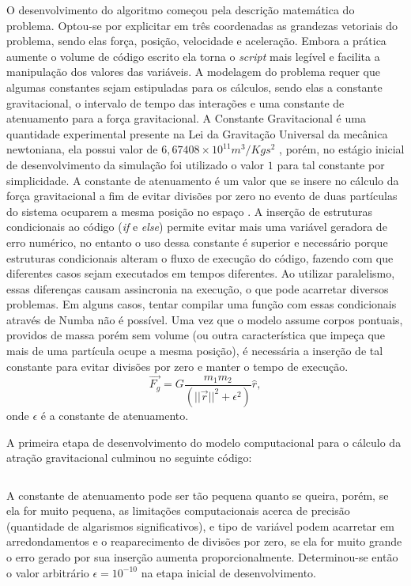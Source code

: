 \documentclass[
	12pt,				%
	a4paper,			%
	english,			%
	openright,				%
	brazil,				%
	oneside]{abntex2}
\begin{document}
	O desenvolvimento do algoritmo começou pela descrição matemática do problema. Optou-se por explicitar em três coordenadas as grandezas vetoriais do problema, sendo elas força, posição, velocidade e aceleração. Embora a prática aumente o volume de código escrito ela torna o \textit{script} mais legível e facilita a manipulação dos valores das variáveis. A modelagem do problema requer que algumas constantes sejam estipuladas para os cálculos, sendo elas a constante gravitacional, o intervalo de tempo das interações e uma constante de atenuamento para a força gravitacional. A Constante Gravitacional é uma quantidade experimental presente na Lei da Gravitação Universal da mecânica newtoniana, ela possui valor de $6,67408\times10^{11} {m^3}/{{Kg}{s^2}}$ \cite{halliday}, porém, no estágio inicial de desenvolvimento da simulação foi utilizado o valor $1$ para tal constante por simplicidade. A constante de atenuamento é um valor que se insere no cálculo da força gravitacional a fim de evitar divisões por zero no evento de duas partículas do sistema ocuparem a mesma posição no espaço \cite{nyland}. A inserção de estruturas condicionais ao código (\textit{if} e \textit{else}) permite evitar mais uma variável geradora de erro numérico, no entanto o uso dessa constante é superior e necessário porque estruturas condicionais alteram o fluxo de execução do código, fazendo com que diferentes casos sejam executados em tempos diferentes. Ao utilizar paralelismo, essas diferenças causam assincronia na execução, o que pode acarretar diversos problemas. Em alguns casos, tentar compilar uma função com essas condicionais através de Numba não é possível. Uma vez que o modelo assume corpos pontuais, providos de massa porém sem volume (ou outra característica que impeça que mais de uma partícula ocupe a mesma posição), é necessária a inserção de tal constante para evitar divisões por zero e manter o tempo de execução.
	\[\vec{F_g} = G\dfrac{m_1m_2}{(||\vec{r}||^2+\epsilon^2)}\hat{r},\]
	onde $\epsilon$ é a constante de atenuamento.
	
	A primeira etapa de desenvolvimento do modelo computacional para o cálculo da atração gravitacional culminou no seguinte código:
	\inputminted[fontsize=\footnotesize]{python}{nbody_codefrac1.py}
	
	A constante de atenuamento pode ser tão pequena quanto se queira, porém, se ela for muito pequena, as limitações computacionais acerca de precisão (quantidade de algarismos significativos), e tipo de variável podem acarretar em arredondamentos e o reaparecimento de divisões por zero, se ela for muito grande o erro gerado por sua inserção aumenta proporcionalmente. Determinou-se então o valor arbitrário $\epsilon = 10^{-10}$ na etapa inicial de desenvolvimento.
		
\end{document}
